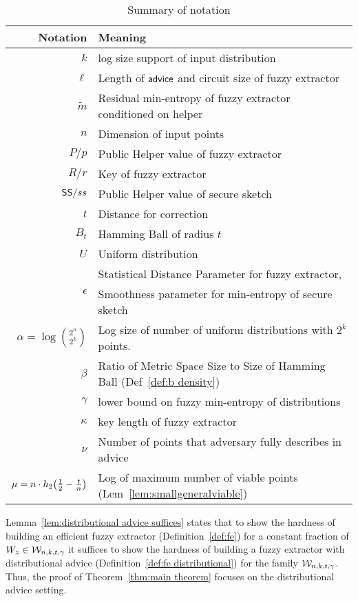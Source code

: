 \begin{table}
\centering
\begin{tabular}{r | l}
Notation & Meaning\\\hline
$k$ & log size support of input distribution\\
$\ell$ & Length of ${\mathsf{advice}}$ and circuit size of fuzzy extractor\\
$\tilde{m}$ & Residual min-entropy of fuzzy extractor conditioned on helper\\
$n$ & Dimension of input points\\
$P/p$ & Public Helper value of fuzzy extractor\\
$R/r$ & Key of fuzzy extractor\\
${\mathsf{SS}}/ss$ & Public Helper value of secure sketch\\
$t$ & Distance for correction\\
$B_t$ & Hamming Ball of radius $t$\\
$U$ & Uniform distribution\\
\multirow{2}{*}{$\epsilon$} & Statistical Distance Parameter for fuzzy extractor,\\
& Smoothness parameter for min-entropy of secure sketch\\
$\alpha = \log{{2^n\choose 2^k}}$ & Log size of number of uniform distributions with $2^k$ points.  \\
$\beta$ & Ratio of Metric Space Size to Size of Hamming Ball (Def~\ref{def:b density})\\
$\gamma$ & lower bound on fuzzy min-entropy of distributions \\
$\kappa$ & key length of fuzzy extractor\\
$\nu$ & Number of points that adversary fully describes in advice\\
$\mu =  n \cdot h_2\!\left(\frac{1}{2} - \frac{t}{n}\right)$ & Log of maximum number of viable points (Lem~\ref{lem:smallgeneralviable})\\
\end{tabular}
\caption{Summary of notation}
\label{tab:notation}
\end{table}
Lemma~\ref{lem:distributional advice suffices} states that to show the hardness of building an efficient fuzzy extractor (Definition~\ref{def:fe}) for a constant fraction of $W_z\in \mathcal{W}_{n,k,t,\gamma}$ it suffices to show the hardness of building a fuzzy extractor with distributional advice (Definition~\ref{def:fe distributional}) for the family $\mathcal{W}_{n,k,t,\gamma}$. Thus, the proof of Theorem~\ref{thm:main theorem} focuses on the distributional advice setting.
